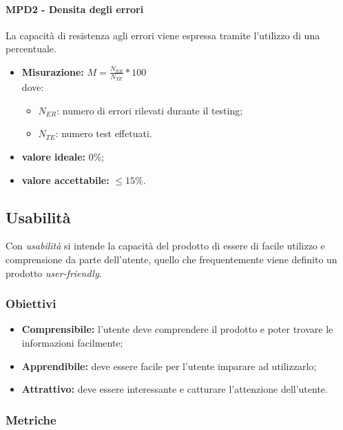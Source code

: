 \paragraph{MPD2 - Densita degli errori} La capacità di resistenza agli errori viene espressa tramite l'utilizzo di una percentuale.
\begin{itemize}
	\item \textbf{Misurazione:} \begin{math}M=\frac{N_{ER}}{N_{TE}}*100\end{math}\\
	dove:
	\begin {itemize}
		\item \begin{math}N_{ER}\end{math}: numero di errori rilevati durante il testing;
		\item \begin{math}N_{TE}\end{math}: numero test effetuati.
	\end{itemize}
	\item \textbf{valore ideale:} 0\%;
	\item \textbf{valore accettabile:}  \begin{math}\leq15\%\end{math}.
\end{itemize}

\subsection{Usabilità}
Con \textit{usabilità} si intende la capacità del prodotto di essere di facile utilizzo e comprensione da parte dell'utente, quello che frequentemente viene definito un prodotto \textit{user-friendly}.
\subsubsection{Obiettivi}
\begin {itemize}
	\item \textbf{Comprensibile:} l'utente deve comprendere il prodotto e poter trovare le informazioni facilmente;
	\item \textbf{Apprendibile:} deve essere facile per l'utente imparare ad utilizzarlo;
	\item \textbf{Attrattivo:} deve essere interessante e catturare l'attenzione dell'utente.
\end{itemize}
\subsubsection{Metriche}

